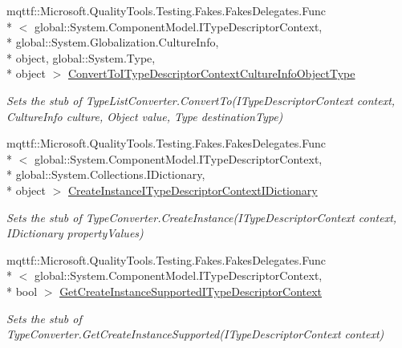 \begin{DoxyCompactItemize}
mqttf\-::\-Microsoft.\-Quality\-Tools.\-Testing.\-Fakes.\-Fakes\-Delegates.\-Func\\*
$<$ global\-::\-System.\-Component\-Model.\-I\-Type\-Descriptor\-Context, \\*
global\-::\-System.\-Globalization.\-Culture\-Info, \\*
object, global\-::\-System.\-Type, \\*
object $>$ \hyperlink{class_system_1_1_component_model_1_1_fakes_1_1_stub_type_list_converter_adebd34601244d6653b252b6e7ea088f3}{Convert\-To\-I\-Type\-Descriptor\-Context\-Culture\-Info\-Object\-Type}
\begin{DoxyCompactList}\small\item\em Sets the stub of Type\-List\-Converter.\-Convert\-To(\-I\-Type\-Descriptor\-Context context, Culture\-Info culture, Object value, Type destination\-Type)\end{DoxyCompactList}\item 
mqttf\-::\-Microsoft.\-Quality\-Tools.\-Testing.\-Fakes.\-Fakes\-Delegates.\-Func\\*
$<$ global\-::\-System.\-Component\-Model.\-I\-Type\-Descriptor\-Context, \\*
global\-::\-System.\-Collections.\-I\-Dictionary, \\*
object $>$ \hyperlink{class_system_1_1_component_model_1_1_fakes_1_1_stub_type_list_converter_a324aaf611218d57930bebf4c4289b14c}{Create\-Instance\-I\-Type\-Descriptor\-Context\-I\-Dictionary}
\begin{DoxyCompactList}\small\item\em Sets the stub of Type\-Converter.\-Create\-Instance(\-I\-Type\-Descriptor\-Context context, I\-Dictionary property\-Values)\end{DoxyCompactList}\item 
mqttf\-::\-Microsoft.\-Quality\-Tools.\-Testing.\-Fakes.\-Fakes\-Delegates.\-Func\\*
$<$ global\-::\-System.\-Component\-Model.\-I\-Type\-Descriptor\-Context, \\*
bool $>$ \hyperlink{class_system_1_1_component_model_1_1_fakes_1_1_stub_type_list_converter_aa065accb9e3ab1174108c6ceb7ac19e0}{Get\-Create\-Instance\-Supported\-I\-Type\-Descriptor\-Context}
\begin{DoxyCompactList}\small\item\em Sets the stub of Type\-Converter.\-Get\-Create\-Instance\-Supported(\-I\-Type\-Descriptor\-Context context)\end{DoxyCompactList}\item 

\end{DoxyCompactItemize}
